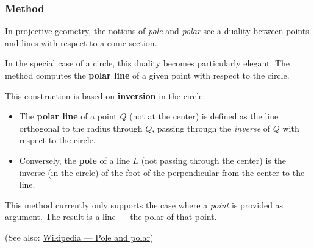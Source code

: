 \subsubsection{Method }
\label{ssub:method_circle_polar_pt}

In projective geometry, the notions of \emph{pole} and \emph{polar} see  a duality between points and lines with respect to a conic section.

\medskip

In the special case of a circle, this duality becomes particularly elegant. The method  computes the \textbf{polar line} of a given point with respect to the circle.

\medskip

This construction is based on \textbf{inversion} in the circle:
\begin{itemize}
  \item The \textbf{polar line} of a point $Q$ (not at the center) is defined as the line orthogonal to the radius through $Q$, passing through the \emph{inverse} of $Q$ with respect to the circle.
  \item Conversely, the \textbf{pole} of a line $L$ (not passing through the center) is the inverse (in the circle) of the foot of the perpendicular from the center to the line.
\end{itemize}


This method currently only supports the case where a \emph{point} is provided as argument. The result is a line — the polar of that point.

\medskip

(See also: \href{https://en.wikipedia.org/wiki/Pole_and_polar}{Wikipedia — Pole and polar})

\vspace{1em}


\begin{tkzexample}[latex = .5\textwidth]
\begin{center}
\end{center}
\end{tkzexample}

